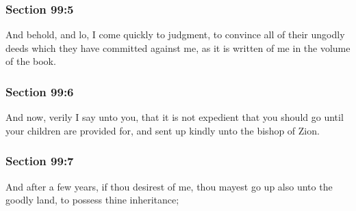 	\subsubsection{Section 99:5} %
		\label{DC99-5}

		And behold, and lo, I come quickly to judgment, to convince all of their ungodly deeds which they have committed against me, as it is written of me in the volume of the book.


	\subsubsection{Section 99:6} %
		\label{DC99-6}

		And now, verily I say unto you, that it is not expedient that you should go until your children are provided for, and sent up kindly unto the bishop of Zion.


	\subsubsection{Section 99:7} %
		\label{DC99-7}

		And after a few years, if thou desirest of me, thou mayest go up also unto the goodly land, to possess thine inheritance;


